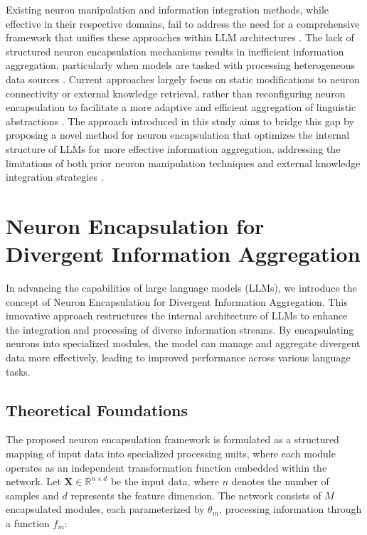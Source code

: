 \documentclass{article}
\begin{document}
Existing neuron manipulation and information integration methods, while effective in their respective domains, fail to address the need for a comprehensive framework that unifies these approaches within LLM architectures \cite{lapov2024dynamic}. The lack of structured neuron encapsulation mechanisms results in inefficient information aggregation, particularly when models are tasked with processing heterogeneous data sources \cite{beaumont2024neural}. Current approaches largely focus on static modifications to neuron connectivity or external knowledge retrieval, rather than reconfiguring neuron encapsulation to facilitate a more adaptive and efficient aggregation of linguistic abstractions \cite{lemal2024dynamic}. The approach introduced in this study aims to bridge this gap by proposing a novel method for neuron encapsulation that optimizes the internal structure of LLMs for more effective information aggregation, addressing the limitations of both prior neuron manipulation techniques and external knowledge integration strategies \cite{merrick2024upscaling}.



\section{Neuron Encapsulation for Divergent Information Aggregation}

In advancing the capabilities of large language models (LLMs), we introduce the concept of Neuron Encapsulation for Divergent Information Aggregation. This innovative approach restructures the internal architecture of LLMs to enhance the integration and processing of diverse information streams. By encapsulating neurons into specialized modules, the model can manage and aggregate divergent data more effectively, leading to improved performance across various language tasks.

\subsection{Theoretical Foundations}

The proposed neuron encapsulation framework is formulated as a structured mapping of input data into specialized processing units, where each module operates as an independent transformation function embedded within the network. Let \( \mathbf{X} \in \mathbb{R}^{n \times d} \) be the input data, where \( n \) denotes the number of samples and \( d \) represents the feature dimension. The network consists of \( M \) encapsulated modules, each parameterized by \( \theta_m \), processing information through a function \( f_m \):
\end{document}
